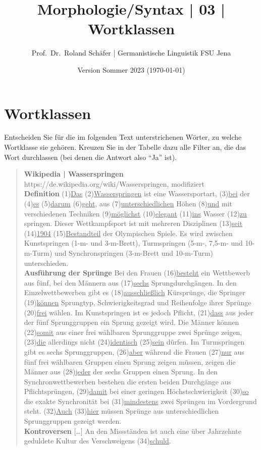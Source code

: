 \documentclass[12pt,a4paper,twoside]{article}
\author{Prof.\ Dr.\ Roland Schäfer | Germanistische Linguistik FSU Jena}
\title{Morphologie\slash Syntax | 03 | Wortklassen}
\date{Version Sommer 2023 (\today)}
\newenvironment{nohyphens}{%
  \par
  \hyphenpenalty=10000
  \exhyphenpenalty=10000
  \sloppy
}{\par}
\begin{document}
\maketitle

\section{Wortklassen}\label{sec:bestimmen}

Entscheiden Sie für die im folgenden Text unterstrichenen Wörter, zu welche Wortklasse sie gehören.
Kreuzen Sie in der Tabelle dazu alle Filter an, die das Wort durchlassen (bei denen die Antwort also "`Ja"' ist). 

\begin{nohyphens}\begin{quote}
  \textbf{Wikipedia | Wasserspringen}\\
  https://de.wikipedia.org/wiki/Wasserspringen, modifiziert\\[0.5\baselineskip]
  \textbf{Definition}
  (1)\ul{Das} (2)\ul{Wasserspringen} ist eine Wassersportart, (3)\ul{bei} der (4)\ul{es} (5)\ul{darum} (6)\ul{geht}, aus (7)\ul{unterschiedlichen} Höhen (8)\ul{und} mit verschiedenen Techniken (9)\ul{möglichst} (10)\ul{elegant} (11)\ul{ins} Wasser (12)\ul{zu} springen.
  Dieser Wettkampfsport ist mit mehreren Disziplinen (13)\ul{seit} (14)\ul{1904} (15)\ul{Bestandteil} der Olympischen Spiele.
  Es wird zwischen Kunstspringen (1-m- und 3-m-Brett), Turmspringen (5-m-, 7,5-m- und 10-m-Turm) und Synchronspringen (3-m-Brett und 10-m-Turm) unterschieden.\\[0.5\baselineskip]
  \textbf{Ausführung der Sprünge}
  Bei den Frauen (16)\ul{besteht} ein Wettbewerb aus fünf, bei den Männern aus (17)\ul{sechs} Sprungdurchgängen.
  In den Einzelwettbewerben gibt es (18)\ul{ausschließlich} Kürsprünge, die Springer (19)\ul{können} Sprungtyp, Schwierigkeitsgrad und Reihenfolge ihrer Sprünge (20)\ul{frei} wählen.
  Im Kunstspringen ist es jedoch Pflicht, (21)\ul{dass} aus jeder der fünf Sprunggruppen ein Sprung gezeigt wird.
  Die Männer können (22)\ul{somit} aus einer frei wählbaren Sprunggruppe zwei Sprünge zeigen, (23)\ul{die} allerdings nicht (24)\ul{identisch} (25)\ul{sein} dürfen.
  Im Turmspringen gibt es sechs Sprunggruppen, (26)\ul{aber} während die Frauen (27)\ul{nur} aus fünf frei wählbaren Gruppen einen Sprung zeigen müssen, zeigen die Männer aus (28)\ul{jeder} der sechs Gruppen einen Sprung.
  In den Synchronwettbewerben bestehen die ersten beiden Durchgänge aus Pflichtsprüngen, (29)\ul{damit} bei einer geringen Höchstschwierigkeit (30)\ul{so} die exakte Synchronität bei (31)\ul{mindestens} zwei Sprüngen im Vordergrund steht.
  (32)\ul{Auch} (33)\ul{hier} müssen Sprünge aus unterschiedlichen Sprunggruppen gezeigt werden.\\[0.5\baselineskip]
  \textbf{Kontroversen} [\ldots] An den Missständen ist auch eine über Jahrzehnte geduldete Kultur des Verschweigens (34)\ul{schuld}.
\end{quote}\end{nohyphens}
\end{document}
